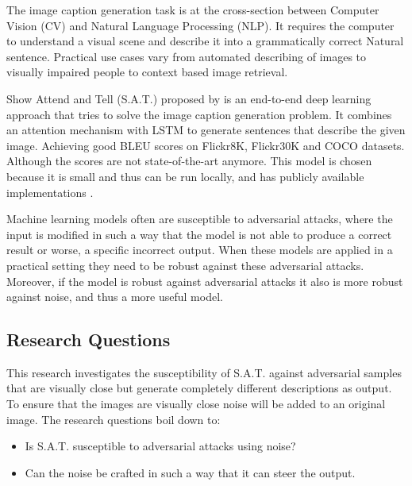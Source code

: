The image caption generation task is at the cross-section between Computer Vision (CV) and Natural Language Processing (NLP). It requires the computer to understand a visual scene  and describe it into a grammatically correct Natural sentence. Practical use cases vary from automated describing of images to visually impaired people \cite{mazzoni_2019} to context based image retrieval.

Show Attend and Tell (S.A.T.) proposed by \citeauthor{xu2016show} is an end-to-end deep learning approach that tries to solve the image caption generation problem. It combines an attention mechanism with LSTM to generate sentences that describe the given image. Achieving good BLEU scores on Flickr8K, Flickr30K\cite{Flickr8k} and COCO\cite{lin2015microsoft} datasets. Although the scores are not state-of-the-art\cite{DBLP:journals/corr/abs-2107-06912} anymore. This model is chosen because it is small and thus can be run locally, and has publicly available implementations \cite{sgrvinod}.

Machine learning models often are susceptible to adversarial attacks, where the input is modified in such a way that the model is not able to produce a correct result or worse, a specific incorrect output. When these models are applied in a practical setting they need to be robust against these adversarial attacks. Moreover, if the model is robust against adversarial attacks it also is more robust against noise, and thus a more useful model.

\subsection*{Research Questions}
This research investigates the susceptibility of S.A.T. against adversarial samples that are visually close but generate completely different descriptions as output. To ensure that the images are visually close noise will be added to an original image.
The research questions boil down to:
\begin{itemize}
    \item Is S.A.T. susceptible to adversarial attacks using noise?
    \item Can the noise be crafted in such a way that it can steer the output.
\end{itemize}




